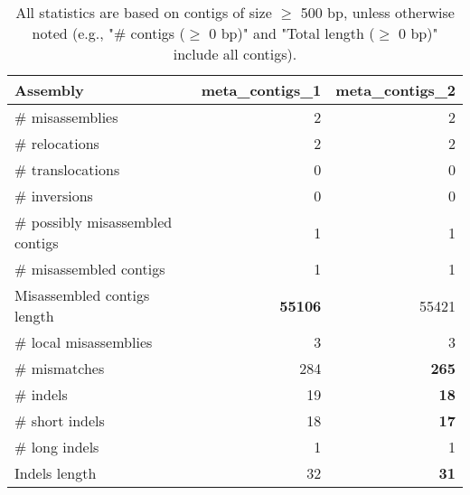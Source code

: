 \documentclass[12pt,a4paper]{article}
\begin{document}
\begin{table}[ht]
\begin{center}
\caption{All statistics are based on contigs of size $\geq$ 500 bp, unless otherwise noted (e.g., "\# contigs ($\geq$ 0 bp)" and "Total length ($\geq$ 0 bp)" include all contigs).}
\begin{tabular}{|l*{2}{|r}|}
\hline
Assembly & meta\_contigs\_1 & meta\_contigs\_2 \\ \hline
\# misassemblies & 2 & 2 \\ \hline
\hspace{5mm}\# relocations & 2 & 2 \\ \hline
\hspace{5mm}\# translocations & 0 & 0 \\ \hline
\hspace{5mm}\# inversions & 0 & 0 \\ \hline
\# possibly misassembled contigs & 1 & 1 \\ \hline
\# misassembled contigs & 1 & 1 \\ \hline
Misassembled contigs length & {\bf 55106} & 55421 \\ \hline
\# local misassemblies & 3 & 3 \\ \hline
\# mismatches & 284 & {\bf 265} \\ \hline
\# indels & 19 & {\bf 18} \\ \hline
\hspace{5mm}\# short indels & 18 & {\bf 17} \\ \hline
\hspace{5mm}\# long indels & 1 & 1 \\ \hline
Indels length & 32 & {\bf 31} \\ \hline
\end{tabular}
\end{center}
\end{table}
\end{document}

